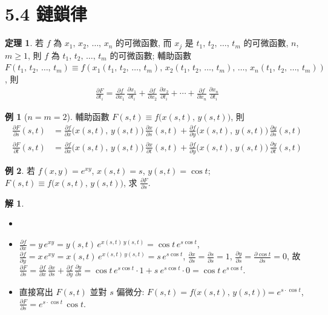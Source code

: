 \documentclass[12pt]{extarticle}
\newcommand{\ds}{\displaystyle}
\theoremstyle{definition}
\newtheorem*{thm}{定理}
\newtheorem*{ex}{例}
\newtheorem*{sol}{解}
\newcommand{\pdiff}[2]{\frac{\partial #1}{\partial #2}}
\begin{document}
\section*{5.4 鏈鎖律} 
\begin{thm}
  若 $f$ 為 $x_1,\,x_2,\,\ldots,\,x_n$ 的可微函數, 而 $x_j$ 是 $t_1,\,t_2,\,\ldots,\,t_m$ 的可微函數, $n$, $m\geqslant 1$, 則 $f$ 為 $t_1,\,t_2,\,\ldots,\,t_m$ 的可微函數; 輔助函數 $F(t_1,\,t_2,\,\ldots,\,t_m)\equiv f(x_1(t_1,\,t_2,\,\ldots,\,t_m),\,x_2(t_1,\,t_2,\,\ldots,\,t_m),\,\ldots,\,x_n(t_1,\,t_2,\,\ldots,\,t_m))$, 則
  \begin{align*}
    \pdiff{F}{t_i} = \pdiff{f}{x_1}\,\pdiff{x_1}{t_i} + \pdiff{f}{x_2}\,\pdiff{x_2}{t_i} + \cdots + \pdiff{f}{x_n}\,\pdiff{x_n}{t_i}
  \end{align*}
\end{thm}

\begin{ex}[$n = m = 2$]
  輔助函數 $\ds F(s, t)\equiv f\big(x(s,t),\,y(s,t)\big)$, 則
  \begin{align*}
    \pdiff{F}{s}(s,t) &= \pdiff{f}{x}\big(x(s,t),\,y(s,t)\big)\,\pdiff{x}{s}(s,t) + \pdiff{f}{y}\big(x(s,t),\,y(s,t)\big)\,\pdiff{y}{s}(s,t) \\
    \pdiff{F}{t}(s,t) &= \pdiff{f}{x}\big(x(s,t),\,y(s,t)\big)\,\pdiff{x}{t}(s,t) + \pdiff{f}{y}\big(x(s,t),\,y(s,t)\big)\,\pdiff{y}{t}(s,t)
  \end{align*}
\end{ex}

\begin{ex}
  若 $\ds f(x, y) = e^{xy}$, $\ds x(s, t) = s$, $\ds y(s, t) = \cos t$; $\ds F(s, t)\equiv f\big(x(s,t),\,y(s,t)\big)$, 求 $\ds\pdiff{F}{s}$. 
\end{ex}
\begin{sol}
  \begin{itemize}\setlength{\itemsep}{0pt}
    \item[]
    \item $\ds\pdiff{f}{x} = y\,e^{xy} = y(s,t)\,e^{x(s,t)\,y(s,t)} = \cos t\,e^{s\cos t}$, $\ds\pdiff{f}{y} = x\,e^{xy} = x(s,t)\,e^{x(s,t)\,y(s,t)} = s\,e^{s\cos t}$, $\ds\pdiff{x}{s} = \pdiff{s}{s} = 1$, $\ds\pdiff{y}{s} = \pdiff{\cos t}{s} = 0$, 故 $\ds\pdiff{F}{s} = \pdiff{f}{x}\,\pdiff{x}{s} + \pdiff{f}{y}\,\pdiff{y}{s} = \cos t\,e^{s\cos t}\cdot 1 + s\ e^{s\cos t}\cdot 0 = \cos t\ e^{s\cos t}$. 
    \item 直接寫出 $F(s, t)$ 並對 $s$ 偏微分: $\ds F(s, t) = f\big(x(s,t),\,y(s,t)\big) = e^{s\cdot\cos t}$, $\ds\pdiff{F}{s} = e^{s\cdot\cos t}\,\cos t$.   
  \end{itemize}
\end{sol}
\end{document}
